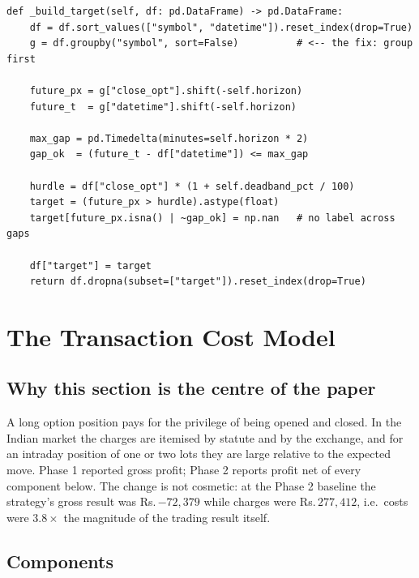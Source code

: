 \documentclass[11pt,a4paper]{article}
\newcommand{\rs}{Rs.\,}                 %
\newcommand{\code}[1]{\texttt{#1}}
\begin{document}
\begin{lstlisting}[caption={Per-contract target construction with gap guard and deadband
(\code{src/models/classifier.py}).},label={lst:label}]
def _build_target(self, df: pd.DataFrame) -> pd.DataFrame:
    df = df.sort_values(["symbol", "datetime"]).reset_index(drop=True)
    g = df.groupby("symbol", sort=False)          # <-- the fix: group first

    future_px = g["close_opt"].shift(-self.horizon)
    future_t  = g["datetime"].shift(-self.horizon)

    max_gap = pd.Timedelta(minutes=self.horizon * 2)
    gap_ok  = (future_t - df["datetime"]) <= max_gap

    hurdle = df["close_opt"] * (1 + self.deadband_pct / 100)
    target = (future_px > hurdle).astype(float)
    target[future_px.isna() | ~gap_ok] = np.nan   # no label across gaps

    df["target"] = target
    return df.dropna(subset=["target"]).reset_index(drop=True)
\end{lstlisting}

\section{The Transaction Cost Model}\label{sec:costs}

\subsection{Why this section is the centre of the paper}

A long option position pays for the privilege of being opened and closed. In the Indian
market the charges are itemised by statute and by the exchange, and for an intraday
position of one or two lots they are large relative to the expected move. Phase 1
reported gross profit; Phase 2 reports profit net of every component below. The change
is not cosmetic: at the Phase 2 baseline the strategy's gross result was \rs$-72{,}379$
while charges were \rs$277{,}412$, i.e.\ costs were $3.8\times$ the magnitude of the
trading result itself.

\subsection{Components}
\end{document}
